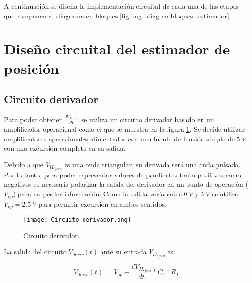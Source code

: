 A continuación se diseña la implementación circuital de cada una de las etapas que componen al diagrama en bloques \ref{fig:img_diag-en-bloques_estimador}.

{
	
}


\section{Diseño circuital del estimador de posición}

\subsection{Circuito derivador}

Para poder obtener $\frac{dV_{IL_{feed}}}{dt}$ se utiliza un circuito derivador basado en un amplificador operacional como el que se muestra en la figura \ref{fig:img_Circuito-derivador}. Se decide utilizar amplificadores operacionales alimentados con una fuente de tensión simple de $5\:V$ con una excursión completa en su salida. 

Debido a que $V_{IL_{feed}}$ es una onda triangular, su derivada será una onda pulsada. Por lo tanto, para poder representar valores de pendientes tanto positivos como negativos es necesario polarizar la salida del derivador en un punto de operación ($V_{op}$) para no perder información. Como la salida varía entre $0\:V$ y $5\:V$ se utiliza $V_{op}=2.5\:V$ para permitir excursión en ambos sentidos.

\begin{figure}[H]
	\centering
	\texttt{[image: Circuito-derivador.png]}
	\caption{Circuito derivador.}
	\label{fig:img_Circuito-derivador}
\end{figure}


La salida del circuito $V_{deriv}(t)$ ante su entrada $V_{IL_{feed}}$ es:

\begin{equation} 
	V_{deriv}(t)\ = V_{op} - \frac{dV_{IL_{feed}}}{dt}*C_1*R_1
\end{equation}

